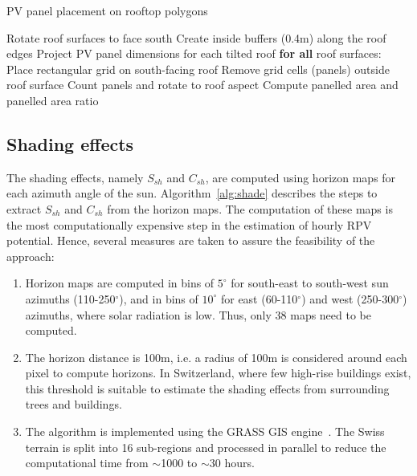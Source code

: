 \begin{algorithm}[htbp]
\caption{PV panel placement on rooftop polygons}
\label{alg:panels}
\begin{algorithmic}[1]
  \footnotesize
  \State Rotate roof surfaces to face south
  \State Create inside buffers (0.4m) along the roof edges
  \State Project PV panel dimensions for each tilted roof
  \Statex \textbf{for all} roof surfaces:
    \State \qquad Place rectangular grid on south-facing roof
    \State \qquad Remove grid cells (panels) outside roof surface
    \State \qquad Count panels and rotate to roof aspect
  \State Compute panelled area and panelled area ratio
\end{algorithmic}
\end{algorithm}

\subsection*{Shading effects}
\label{app:shade}

The shading effects, namely $S_{sh}$ and $C_{sh}$, are computed using horizon maps for each azimuth angle of the sun. Algorithm~\ref{alg:shade} describes the steps to extract $S_{sh}$ and $C_{sh}$ from the horizon maps.
The computation of these maps is the most computationally expensive step in the estimation of hourly RPV potential. Hence, several measures are taken to assure the feasibility of the approach:

\begin{enumerate}
    \item Horizon maps are computed in bins of $5^\circ$ for south-east to south-west sun azimuths (110-250$^\circ$), and in bins of $10^\circ$ for east (60-110$^\circ$) and west (250-300$^\circ$) azimuths, where solar radiation is low. Thus, only 38 maps need to be computed.
    \item The horizon distance is 100m, i.e. a radius of 100m is considered around each pixel to compute horizons. In Switzerland, where few high-rise buildings exist, this threshold is suitable to estimate the shading effects from surrounding trees and buildings.
    \item The algorithm is implemented using the GRASS GIS engine~\cite{neteler_grass_2012}. The Swiss terrain is split into 16 sub-regions and processed in parallel to reduce the computational time from $\sim$1000 to $\sim$30 hours. 
    
\end{enumerate}

